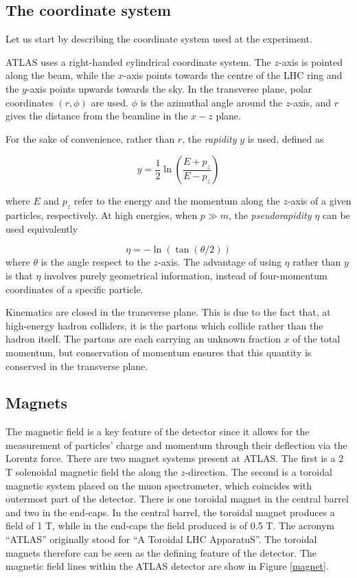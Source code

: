\documentclass[10pt,a4paper]{book}
\begin{document}
\subsection{The coordinate system}
Let us start by describing the coordinate system used at the experiment. 

ATLAS uses a right-handed cylindrical coordinate system. The $z$-axis is pointed along the beam, while the $x$-axis points towards the centre of the LHC ring and the $y$-axis points upwards towards the sky. 
In the transverse plane, polar coordinates $(r, \phi)$ are used. $\phi$ is the azimuthal angle around the $z$-axis, and $r$ gives the distance from the beamline in the $x-z$ plane.

For the sake of convenience, rather than $r$, the \emph{rapidity} $y$ is used, defined as

\begin{equation}
    y = \frac{1}{2}\ln\left(\frac{E + p_z}{E - p_z} \right)
\end{equation}

where $E$ and $p_z$ refer to the energy and the momentum along the $z$-axis of a given particles, respectively. At high energies, when $p \gg m$, the \emph{pseudorapidity} $\eta$ can be used equivalently

\begin{equation}
    \eta = -\ln\left(\tan(\theta/2)\right)
\end{equation}
where $\theta$ is the angle respect to the $z$-axis. The advantage of using $\eta$ rather than $y$ is that $\eta$ involves purely geometrical information, instead of four-momentum coordinates of a specific particle. 

Kinematics are closed in the transverse plane. This is due to the fact that, at high-energy hadron colliders, it is the partons which collide rather than the hadron itself. The partons are each carrying an unknown fraction $x$ of the total momentum, but conservation of momentum ensures that this quantity is conserved in the transverse plane.

\subsection{Magnets}

The magnetic field is a key feature of the detector since it allows for the measurement of particles' charge and momentum through their deflection via the Lorentz force. There are two magnet systems present at ATLAS. The first is a 2 T solenoidal magnetic field the along the $z$-direction. The second is a toroidal magnetic system placed on the muon spectrometer, which coincides with outermost part of the detector. There is one toroidal magnet in the central barrel and two in the end-caps. In the central barrel, the toroidal magnet produces a field of 1 T, while in the end-caps the field produced is of 0.5 T. The acronym ``ATLAS'' originally stood for ``A Toroidal LHC ApparatuS''. The toroidal magnets therefore can be seen as the defining feature of the detector. The magnetic field lines within the ATLAS detector are show in Figure \ref{magnet}.
\end{document}
